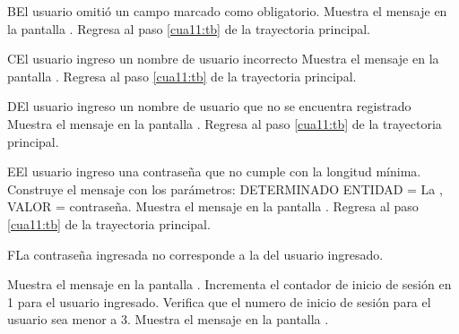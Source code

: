  \begin{UCtrayectoriaA}{B}{El usuario omitió un campo marcado como obligatorio.}
 	\UCpaso[\UCsist] Muestra el mensaje  en la pantalla .
	\UCpaso[] Regresa al paso \ref{cua11:tb} de la trayectoria principal. 
	
\end{UCtrayectoriaA}


 \begin{UCtrayectoriaA}{C}{El usuario ingreso un nombre de usuario incorrecto}
	\UCpaso[\UCsist] Muestra el mensaje  en la pantalla .
	\UCpaso[] Regresa al paso \ref{cua11:tb} de la trayectoria principal. 
	
\end{UCtrayectoriaA}

 \begin{UCtrayectoriaA}{D}{El usuario ingreso un nombre de usuario que no se encuentra registrado}
	\UCpaso[\UCsist] Muestra el mensaje  en la pantalla .
	\UCpaso[] Regresa al paso \ref{cua11:tb} de la trayectoria principal. 
	
\end{UCtrayectoriaA}

 \begin{UCtrayectoriaA}{E}{El usuario ingreso una contraseña que no cumple con la longitud mínima.}
 	\UCpaso[\UCsist] Construye el mensaje  con los parámetros: DETERMINADO ENTIDAD = La , VALOR = contraseña.
	\UCpaso[\UCsist] Muestra el mensaje  en la pantalla .
	\UCpaso[] Regresa al paso \ref{cua11:tb} de la trayectoria principal. 
\end{UCtrayectoriaA}

 \begin{UCtrayectoriaA}{F}{La contraseña ingresada no corresponde a la del usuario ingresado.}
	
	\UCpaso[\UCsist] Muestra el mensaje  en la pantalla .
	\UCpaso[\UCsist] Incrementa el contador de inicio de sesión en 1 para el usuario ingresado.
	\UCpaso[\UCsist] Verifica que el numero de inicio de sesión para el usuario sea menor a 3. 
	\UCpaso[\UCsist] Muestra el mensaje  en la pantalla .
	
\end{UCtrayectoriaA}

